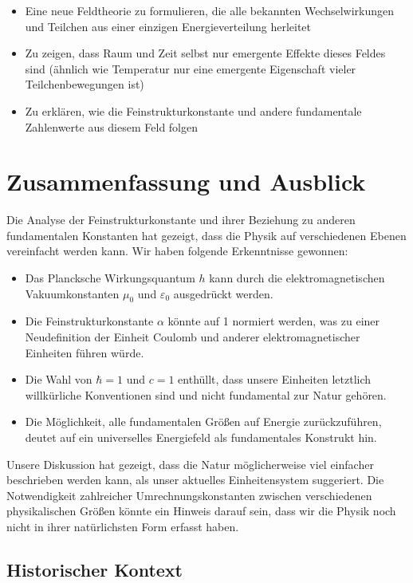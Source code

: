 \documentclass{article}
\begin{document}
	\begin{itemize}
		\item Eine neue Feldtheorie zu formulieren, die alle bekannten Wechselwirkungen und Teilchen aus einer einzigen Energieverteilung herleitet
		\item Zu zeigen, dass Raum und Zeit selbst nur emergente Effekte dieses Feldes sind (ähnlich wie Temperatur nur eine emergente Eigenschaft vieler Teilchenbewegungen ist)
		\item Zu erklären, wie die Feinstrukturkonstante und andere fundamentale Zahlenwerte aus diesem Feld folgen
	\end{itemize}
	
	\section{Zusammenfassung und Ausblick}
	
	Die Analyse der Feinstrukturkonstante und ihrer Beziehung zu anderen fundamentalen Konstanten hat gezeigt, dass die Physik auf verschiedenen Ebenen vereinfacht werden kann. Wir haben folgende Erkenntnisse gewonnen:
	
	\begin{itemize}
		\item Das Plancksche Wirkungsquantum $h$ kann durch die elektromagnetischen Vakuumkonstanten $\mu_0$ und $\varepsilon_0$ ausgedrückt werden.
		\item Die Feinstrukturkonstante $\alpha$ könnte auf 1 normiert werden, was zu einer Neudefinition der Einheit Coulomb und anderer elektromagnetischer Einheiten führen würde.
		\item Die Wahl von $\hbar = 1$ und $c = 1$ enthüllt, dass unsere Einheiten letztlich willkürliche Konventionen sind und nicht fundamental zur Natur gehören.
		\item Die Möglichkeit, alle fundamentalen Größen auf Energie zurückzuführen, deutet auf ein universelles Energiefeld als fundamentales Konstrukt hin.
	\end{itemize}
	
	Unsere Diskussion hat gezeigt, dass die Natur möglicherweise viel einfacher beschrieben werden kann, als unser aktuelles Einheitensystem suggeriert. Die Notwendigkeit zahlreicher Umrechnungskonstanten zwischen verschiedenen physikalischen Größen könnte ein Hinweis darauf sein, dass wir die Physik noch nicht in ihrer natürlichsten Form erfasst haben.
	
	\subsection{Historischer Kontext}
	
\end{document}
